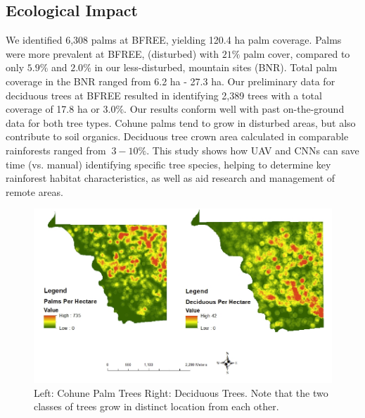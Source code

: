 \subsection{Ecological Impact}

We identified 6,308 palms at BFREE, yielding 120.4 ha palm coverage. Palms were more prevalent at BFREE, (disturbed) with $21\%$ palm cover, compared to only $5.9\%$ and $2.0\%$ in our less-disturbed, mountain sites (BNR). Total palm coverage in the BNR ranged from 6.2 ha - 27.3 ha. Our preliminary data for deciduous trees at BFREE resulted in identifying 2,389 trees with a total coverage of 17.8 ha or $3.0\%$. Our results conform well with past on-the-ground data for both tree types. Cohune palms tend to grow in disturbed areas, but also contribute to soil organics. Deciduous tree crown area calculated in comparable rainforests ranged from $~3-10\%$. This study shows how UAV and CNNs can save time (vs. manual) identifying specific tree species, helping to determine key rainforest habitat characteristics, as well as aid research and management of remote areas.

\begin{figure}[ht]
\includegraphics[width=1.0\textwidth]{Figures/HeatMaps.png}
\caption{Left: Cohune Palm Trees Right: Deciduous Trees. Note that the two classes of trees grow in distinct location from each other.}
\label{fig:HeatMaps}
\end{figure}
